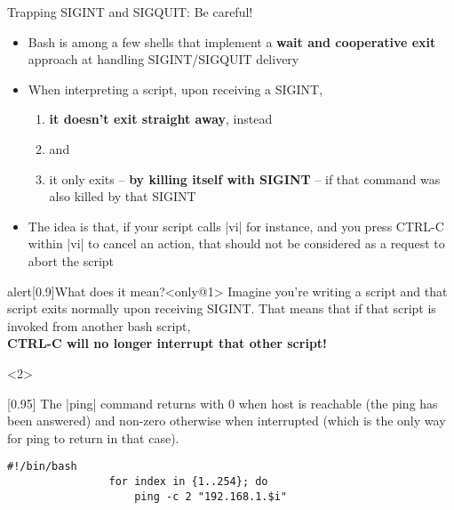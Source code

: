 \begin{frame}[fragile]{Trapping SIGINT and SIGQUIT: Be careful!}
    \vspace{-3mm}
    \begin{overlayarea}{\textwidth}{0.7\textheight}
        \begin{itemize}
            \item Bash is among a few shells that implement a \textbf{wait and cooperative exit} approach at handling SIGINT/SIGQUIT delivery
            \item When interpreting a script, upon receiving a SIGINT,
            \begin{enumerate}
                \item \textbf{it doesn't exit straight away}, instead
                \item {} and
                \item \alert{it only exits -- \textbf{by killing itself with SIGINT} -- if that command was also killed by that SIGINT}
            \end{enumerate}
            \item<only@1> The idea is that, if your script calls \bash|vi| for instance, and you press CTRL-C within \bash|vi| to cancel an action, that should not be considered as a request to abort the script
        \end{itemize}
        \begin{varblock}{alert}[0.9\textwidth]{What does it mean?}<only@1>
            Imagine you're writing a script and that script exits normally upon receiving SIGINT.
            That means that if that script is invoked from another bash script, \\\alert{\textbf{CTRL-C will no longer interrupt that other script!}}
        \end{varblock}
        \begin{onlyenv}<2>
            \begin{varblock}{}[0.95\textwidth]{}
                \small The \bash|ping| command returns with 0 when host is reachable (the ping has been answered) and non-zero otherwise when interrupted (which is the only way for ping to return in that case).
            \end{varblock}
            \begin{lstlisting}[style=MyBash, belowskip=-5mm]
                #!/bin/bash
                for index in {1..254}; do
                    ping -c 2 "192.168.1.$i"

\end{lstlisting}
\end{onlyenv}
\end{overlayarea}
\end{frame}
